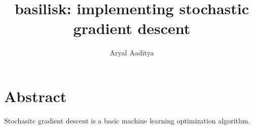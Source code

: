 \documentclass{article}
\title{basilisk: implementing stochastic gradient descent}
\author{Aryal Aaditya}
\begin{document}
  \maketitle
  \section{Abstract}
	Stochasitc gradient descent is a basic machine 
	learning optimization algorithm. 	
\end{document}
